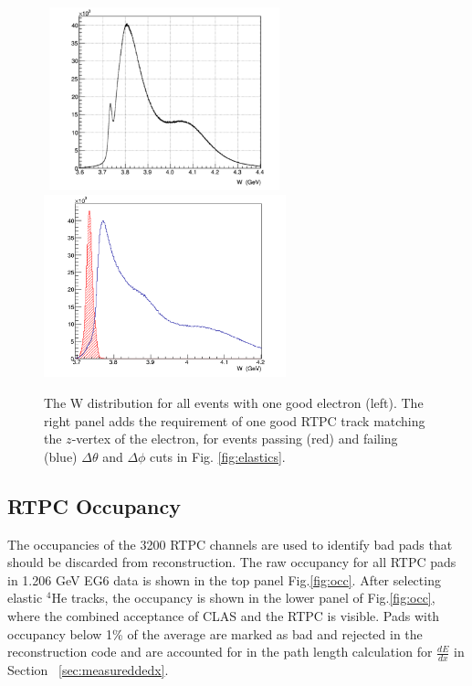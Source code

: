 \documentclass[amsmath,amssymb,notitlepage,12pt]{revtex4-1}
\begin{document}
\begin{figure}[htbp]\centering
    \includegraphics[width=7cm,height=5.3cm]{Wall_small.png}
    \includegraphics[width=7cm]{W_small.png}
    \caption{\label{fig:elasticsW}The W distribution for all events with one good electron (left).   The right panel adds the requirement of one good RTPC track matching the $z$-vertex of the electron, for events passing (red) and failing (blue) $\Delta\theta$ and $\Delta\phi$ cuts in Fig. \ref{fig:elastics}.}
\end{figure}

\subsection{RTPC Occupancy}
The occupancies of the 3200 RTPC channels are used to identify bad pads that should be discarded from reconstruction.
The raw occupancy for all RTPC pads in 1.206 GeV EG6 data is shown in the top panel Fig.\ref{fig:occ}.
After selecting elastic $^4$He tracks, the occupancy is shown in the lower panel of Fig.\ref{fig:occ}, where the combined acceptance of CLAS and the RTPC is visible.
Pads with occupancy below 1\% of the average are marked as bad and rejected in the reconstruction code and are accounted for in the path length calculation for $\frac{dE}{dx}$ in Section ~\ref{sec:measureddedx}.
\end{document}
